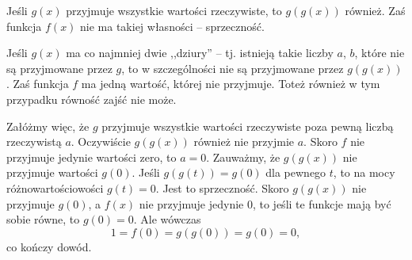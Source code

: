\vspace{10px}

\noindent
Jeśli $g(x)$ przyjmuje wszystkie wartości rzeczywiste, to $g(g(x))$ również. Zaś funkcja $f(x)$ nie ma takiej własności -- sprzeczność.

\vspace{10px}

\noindent
Jeśli $g(x)$ ma co najmniej dwie ,,dziury'' -- tj. istnieją takie liczby $a$, $b$, które nie są przyjmowane przez $g$, to w szczególności nie są przyjmowane przez $g(g(x))$. Zaś funkcja $f$ ma jedną wartość, której nie przyjmuje. Toteż również w tym przypadku równość zajść nie może.

\vspace{10px}

\noindent
Załóżmy więc, że $g$ przyjmuje wszystkie wartości rzeczywiste poza pewną liczbą rzeczywistą $a$. Oczywiście $g(g(x))$ również nie przyjmie $a$. Skoro $f$ nie przyjmuje jedynie wartości zero, to $a = 0$. Zauważmy, że $g(g(x))$ nie przyjmuje wartości $g(0)$. Jeśli $g(g(t)) =  g(0)$ dla pewnego $t$, to na mocy różnowartościowości $g(t) = 0$. Jest to sprzeczność. Skoro $g(g(x))$ nie przyjmuje $g(0)$, a $f(x)$ nie przyjmuje jedynie $0$, to jeśli te funkcje mają być sobie równe, to $g(0) = 0$. Ale wówczas
\[
	1 = f(0) = g(g(0)) = g(0) = 0,
\]
co kończy dowód.